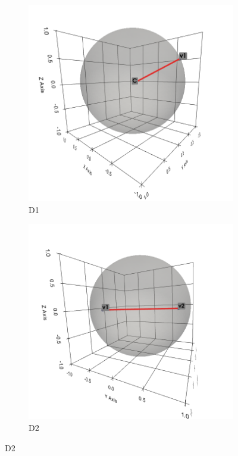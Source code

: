 \begin{figure}[ht]
    \centering
    
    \begin{subfigure}[b]{0.4\textwidth}
        \includegraphics[width=\textwidth]{assets/visualisation/D1.png}
        \caption{D1}
        \label{fig:local_descriptor_visualisation_D1}
    \end{subfigure}
    \hfill
    \begin{subfigure}[b]{0.4\textwidth}
        \includegraphics[width=\textwidth]{assets/visualisation/D2.png}
        \caption{D2}
        \label{fig:local_descriptor_visualisation_D2}
    \end{subfigure}
    \hfill
    

\end{figure}
